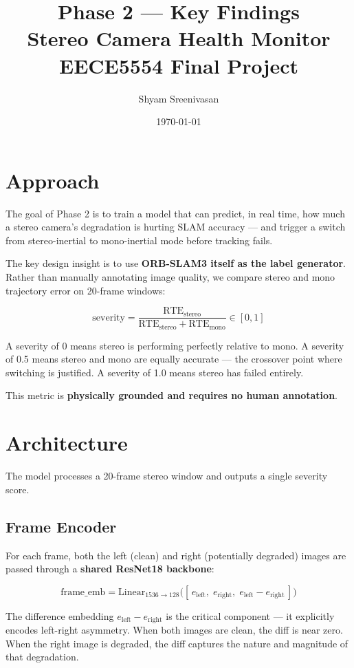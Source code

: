 \documentclass[11pt, a4paper]{article}
\title{
    \textbf{Phase 2 — Key Findings} \\
    \large Stereo Camera Health Monitor \\
    \normalsize EECE5554 Final Project
}
\author{Shyam Sreenivasan}
\date{\today}
\begin{document}
\maketitle

\section{Approach}

The goal of Phase 2 is to train a model that can predict, in real time, how
much a stereo camera's degradation is hurting SLAM accuracy --- and trigger a
switch from stereo-inertial to mono-inertial mode before tracking fails.

The key design insight is to use \textbf{ORB-SLAM3 itself as the label
generator}. Rather than manually annotating image quality, we compare stereo
and mono trajectory error on 20-frame windows:

$$\text{severity} = \frac{\text{RTE}_{\text{stereo}}}{\text{RTE}_{\text{stereo}} + \text{RTE}_{\text{mono}}} \in [0, 1]$$

A severity of 0 means stereo is performing perfectly relative to mono.
A severity of 0.5 means stereo and mono are equally accurate --- the
crossover point where switching is justified.
A severity of 1.0 means stereo has failed entirely.

This metric is \textbf{physically grounded and requires no human annotation}.

\section{Architecture}

The model processes a 20-frame stereo window and outputs a single severity
score.

\subsection{Frame Encoder}
For each frame, both the left (clean) and right (potentially degraded) images
are passed through a \textbf{shared ResNet18 backbone}:

$$\text{frame\_emb} = \text{Linear}_{1536 \to 128}\bigl([\,e_{\text{left}},\; e_{\text{right}},\; e_{\text{left}} - e_{\text{right}}\,]\bigr)$$

The difference embedding $e_{\text{left}} - e_{\text{right}}$ is the critical
component --- it explicitly encodes left-right asymmetry. When both images are
clean, the diff is near zero. When the right image is degraded, the diff
captures the nature and magnitude of that degradation.
\end{document}
